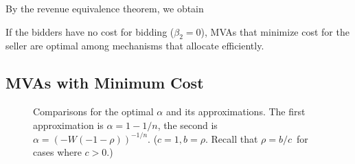 By the revenue equivalence theorem,  we obtain%

\begin{corollary}
If the bidders have no cost for bidding ($\beta_2=0$), MVAs 
that minimize cost for the seller
are optimal
among mechanisms that allocate efficiently.
\end{corollary}

\subsection{MVAs with Minimum Cost}
\label{sec:alpha-MVA}

\begin{figure}
\centering
  \caption{Comparisons for the optimal $\alpha$ and its approximations. The first
  approximation is $\alpha = 1-1/n$, the second is $\alpha =
  (-W(-1-\rho))^{-1/n}$. ($c = 1, b = \rho$. Recall that $\rho = b/c$~for cases where $c > 0$.)}
  \label{fig:alpha}
\end{figure}


